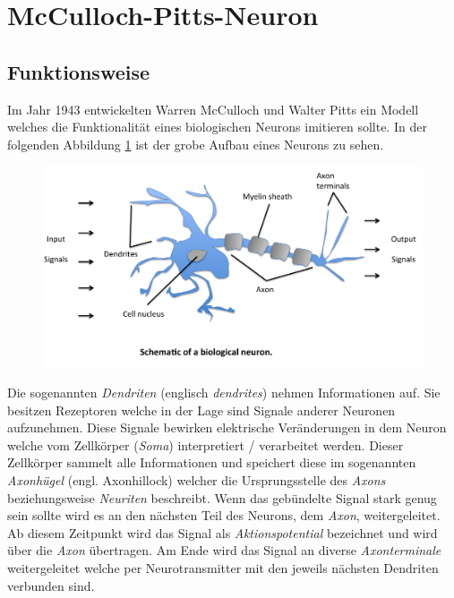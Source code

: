 \section{McCulloch-Pitts-Neuron} \label{sc:mpn}

\subsection{Funktionsweise}

Im Jahr 1943 entwickelten Warren McCulloch und Walter Pitts ein Modell welches die Funktionalität eines biologischen Neurons imitieren sollte. In der folgenden Abbildung \ref{fig:bioNeuron} ist der grobe Aufbau eines Neurons zu sehen. 

\begin{figure}[!htb]
	\centering
	\includegraphics[width=\linewidth]{img/bioNeuron}
	\label{fig:bioNeuron}
\end{figure}

Die sogenannten \emph{Dendriten} (englisch \emph{dendrites}) nehmen Informationen auf. Sie besitzen Rezeptoren welche in der Lage sind Signale anderer Neuronen aufzunehmen. Diese Signale bewirken elektrische Veränderungen in dem Neuron welche vom Zellkörper (\emph{Soma}) interpretiert / verarbeitet werden. Dieser Zellkörper sammelt alle Informationen und speichert diese im sogenannten \emph{Axonhügel} (engl. Axonhillock) welcher die Ursprungsstelle des \emph{Axons} beziehungsweise \emph{Neuriten} beschreibt. Wenn das gebündelte Signal stark genug sein sollte wird es an den nächsten Teil des Neurons, dem \emph{Axon}, weitergeleitet. Ab diesem Zeitpunkt wird das Signal als \emph{Aktionspotential} bezeichnet und wird über die \emph{Axon} übertragen. Am Ende wird das Signal an diverse \emph{Axonterminale} weitergeleitet welche per Neurotransmitter mit den jeweils nächsten Dendriten verbunden sind. 

